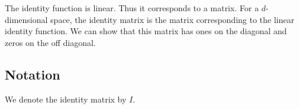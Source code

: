 
\sbasic




















\sstart
{}



The identity function is linear.
Thus it corresponds to a
matrix. For a $d$-dimensional
space, the identity matrix
is the matrix corresponding
to the linear identity function.
We can show that this matrix
has ones on the diagonal and
zeros on the off diagonal.

\subsection{Notation}

We denote the identity
matrix by $I$.

\strats
